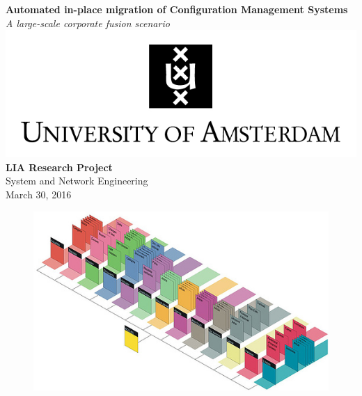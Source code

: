 \documentclass[a4paper, 11pt]{article}
\author{%
	\vspace{.30cm}
    \textbf{Bram ter Borch} \\
    \texttt{\footnotesize bram.terborch@os3.nl}\vspace{35pt}
    \textbf{Siem Hermans} \\
    \texttt{\footnotesize siem.hermans@os3.nl}
    }
\begin{document}
\begin{titlepage}
\begin{center}
  \textbf{\huge Automated in-place migration of Configuration Management Systems \\}
  \vspace{.3cm}
  \Large \textit{A large-scale corporate fusion scenario}
  \\
  \vspace{.5cm}
  \includegraphics[scale=1.2]{img/UvA-logo-english.jpg}
  \\
  \vspace{.5cm}
  \normalsize \textbf{LIA Research Project}
  \\
  \normalsize System and Network Engineering
  \\
  \vspace{.3cm}
  \normalsize {March 30, 2016}
  \vspace{.2cm}
\end{center}

\begin{figure}[!hb]
  \begin{center}
  	\includegraphics[scale=0.55]{img/cover.jpg}
  \end{center}
\end{figure}


\end{titlepage}
\end{document}
